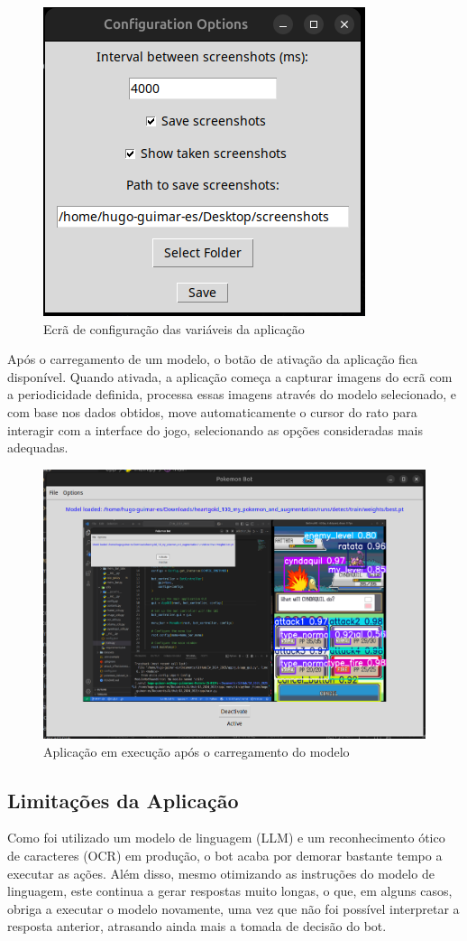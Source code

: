 \begin{figure}[ht]
    \centering
    \includegraphics[width=0.4\linewidth]{imagens/configuracoes.png}
    \caption{Ecrã de configuração das variáveis da aplicação}
    \label{fig:configuracoes}
\end{figure}

Após o carregamento de um modelo, o botão de ativação da aplicação fica disponível. Quando ativada, a aplicação começa a capturar imagens do ecrã com a periodicidade definida, processa essas imagens através do modelo selecionado, e com base nos dados obtidos, move automaticamente o cursor do rato para interagir com a interface do jogo, selecionando as opções consideradas mais adequadas.

\begin{figure}[ht]
    \centering
    \includegraphics[width=1.0\linewidth]{imagens/aplicacao_em_execucao.png}
    \caption{Aplicação em execução após o carregamento do modelo}
    \label{fig:aplicacao_em_execucao}
\end{figure}

\subsection{Limitações da Aplicação}
Como foi utilizado um modelo de linguagem (LLM) e um reconhecimento ótico de caracteres (OCR) em produção, o bot acaba por demorar bastante tempo a executar as ações. Além disso, mesmo otimizando as instruções do modelo de linguagem, este continua a gerar respostas muito longas, o que, em alguns casos, obriga a executar o modelo novamente, uma vez que não foi possível interpretar a resposta anterior, atrasando ainda mais a tomada de decisão do bot.

